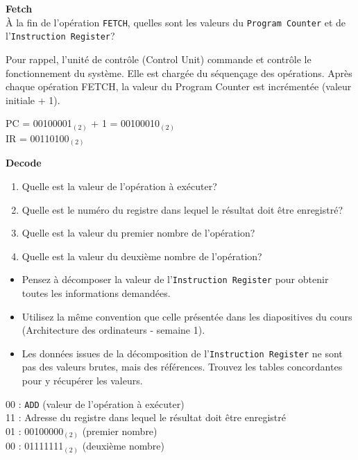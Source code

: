\begin{Exercice}[5 minutes]\textbf{Fetch}\\
    À la fin de l'opération \lstinline{FETCH}, quelles sont les valeurs du \lstinline{Program Counter} et de l'\lstinline{Instruction Register}?
\end{Exercice}
   \begin{conseil}
    Pour rappel, l'unité de contrôle (Control Unit) commande et contrôle le fonctionnement du système. Elle est chargée du séquençage des opérations. Après chaque opération FETCH, la valeur du Program Counter est incrémentée (valeur initiale + 1).
    \end{conseil}
\begin{solution}
    PC = 00100001$_{(2)}$ + 1 = 00100010$_{(2)}$\\
    IR = 00110100$_{(2)}$
\end{solution}

\begin{Exercice}[5 minutes] \textbf{Decode}
    \begin{enumerate}
        \item Quelle est la valeur de l'opération à exécuter?
        \item Quelle est le numéro du registre dans lequel le résultat doit être enregistré?
        \item Quelle est la valeur du premier nombre de l'opération?
        \item Quelle est la valeur du deuxième nombre de l'opération?
    \end{enumerate}
\end{Exercice}
   \begin{conseil}
    \begin{itemize}
        \item Pensez à décomposer la valeur de l’\lstinline{Instruction Register} pour obtenir toutes les informations demandées.
        \item  Utilisez la même convention que celle présentée dans les diapositives du cours (Architecture des ordinateurs - semaine 1).
        \item Les données issues de la décomposition de l’\lstinline{Instruction Register} ne sont pas des valeurs brutes, mais des références. Trouvez les tables concordantes pour y récupérer les valeurs.
    \end{itemize}
    
    \end{conseil}
\begin{solution}
    00 : \lstinline{ADD} (valeur de l'opération à exécuter)\\
    11 : Adresse du registre dans lequel le résultat doit être enregistré\\
    01 : 00100000$_{(2)}$ (premier nombre)\\
    00 : 01111111$_{(2)}$ (deuxième nombre)
\end{solution}

